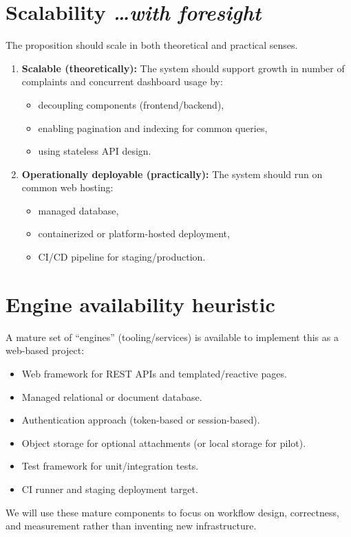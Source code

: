 \documentclass[11pt,a4paper]{article}
\newcommand{\BvrHint}[1]{%
  {\normalfont\normalsize\itshape\hfill #1}}
\begin{document}
\section{Scalability %
\BvrHint{\ldots with foresight}}
The proposition should scale in both theoretical and practical senses.

\begin{enumerate}[leftmargin=0.7cm]
    \item \textbf{Scalable (theoretically):} The system should support growth in number of complaints and concurrent dashboard usage by:
    \begin{itemize}[leftmargin=0.7cm]
        \item decoupling components (frontend/backend),
        \item enabling pagination and indexing for common queries,
        \item using stateless API design.
    \end{itemize}
    
    \item \textbf{Operationally deployable (practically):} The system should run on common web hosting:
    \begin{itemize}[leftmargin=0.7cm]
        \item managed database,
        \item containerized or platform-hosted deployment,
        \item CI/CD pipeline for staging/production.
    \end{itemize}
\end{enumerate}

\section{Engine availability heuristic}
A mature set of ``engines'' (tooling/services) is available to implement this as a web-based project:
\begin{itemize}[leftmargin=0.7cm]
    \item Web framework for REST APIs and templated/reactive pages.
    \item Managed relational or document database.
    \item Authentication approach (token-based or session-based).
    \item Object storage for optional attachments (or local storage for pilot).
    \item Test framework for unit/integration tests.
    \item CI runner and staging deployment target.
\end{itemize}
We will use these mature components to focus on workflow design, correctness, and measurement rather than inventing new infrastructure.
\end{document}

